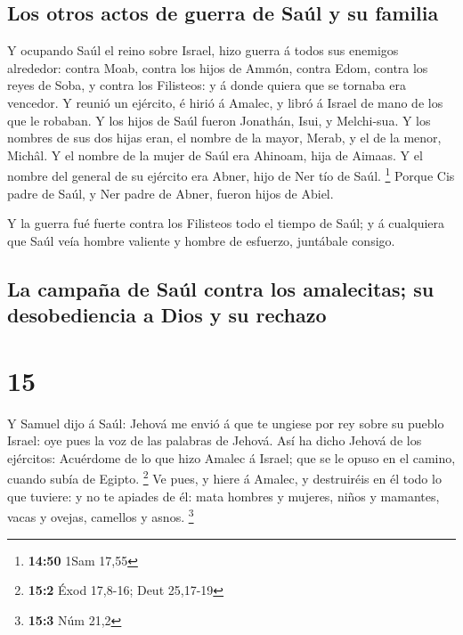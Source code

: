 \hypertarget{los-otros-actos-de-guerra-de-sauxfal-y-su-familia}{%
\subsection{Los otros actos de guerra de Saúl y su
familia}\label{los-otros-actos-de-guerra-de-sauxfal-y-su-familia}}

 Y ocupando Saúl el reino sobre Israel, hizo guerra á
todos sus enemigos alrededor: contra Moab, contra los hijos de Ammón,
contra Edom, contra los reyes de Soba, y contra los Filisteos: y á donde
quiera que se tornaba era vencedor.  Y reunió un
ejército, é hirió á Amalec, y libró á Israel de mano de los que le
robaban.  Y los hijos de Saúl fueron Jonathán, Isui, y
Melchi-sua. Y los nombres de sus dos hijas eran, el nombre de la mayor,
Merab, y el de la menor, Michâl.  Y el nombre de la mujer
de Saúl era Ahinoam, hija de Aimaas. Y el nombre del general de su
ejército era Abner, hijo de Ner tío de Saúl. \footnote{\textbf{14:50}
  1Sam 17,55}  Porque Cis padre de Saúl, y Ner padre de
Abner, fueron hijos de Abiel.

 Y la guerra fué fuerte contra los Filisteos todo el
tiempo de Saúl; y á cualquiera que Saúl veía hombre valiente y hombre de
esfuerzo, juntábale consigo.

\hypertarget{la-campauxf1a-de-sauxfal-contra-los-amalecitas-su-desobediencia-a-dios-y-su-rechazo}{%
\subsection{La campaña de Saúl contra los amalecitas; su desobediencia a
Dios y su
rechazo}\label{la-campauxf1a-de-sauxfal-contra-los-amalecitas-su-desobediencia-a-dios-y-su-rechazo}}

\hypertarget{section-14}{%
\section{15}\label{section-14}}

 Y Samuel dijo á Saúl: Jehová me envió á que te ungiese
por rey sobre su pueblo Israel: oye pues la voz de las palabras de
Jehová.  Así ha dicho Jehová de los ejércitos: Acuérdome
de lo que hizo Amalec á Israel; que se le opuso en el camino, cuando
subía de Egipto. \footnote{\textbf{15:2} Éxod 17,8-16; Deut 25,17-19}
 Ve pues, y hiere á Amalec, y destruiréis en él todo lo
que tuviere: y no te apiades de él: mata hombres y mujeres, niños y
mamantes, vacas y ovejas, camellos y asnos. \footnote{\textbf{15:3} Núm
  21,2}

